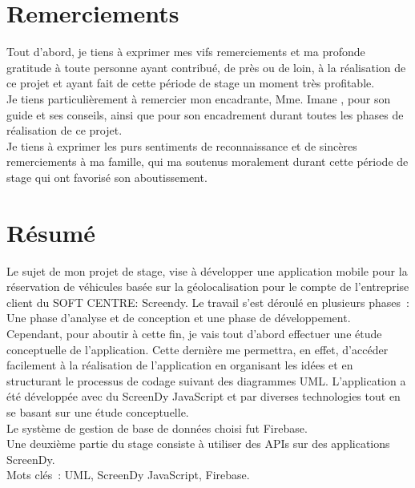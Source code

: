 \documentclass[12pt,a4paper]{report}
\begin{document}
	\chapter*{Remerciements}
	
	Tout d'abord, je tiens à exprimer mes vifs remerciements et ma profonde gratitude à toute personne ayant contribué, de près ou de loin, à la réalisation de ce projet et ayant fait de cette période de stage un moment très profitable.\\
	\newline
	Je tiens particulièrement à remercier mon encadrante, Mme. Imane , pour son guide et ses conseils, ainsi que pour son encadrement durant toutes les phases de réalisation de ce projet.\\
	\newline
	Je tiens à exprimer les purs sentiments de reconnaissance et de sincères remerciements à ma famille, qui ma soutenus moralement durant cette période de stage qui ont favorisé son aboutissement.





	\chapter*{Résumé}
	Le sujet de mon projet de stage, vise à développer une application mobile pour la réservation de véhicules basée sur la géolocalisation pour le compte de l'entreprise client du SOFT CENTRE: Screendy. Le travail s’est déroulé en plusieurs phases : Une phase d’analyse et de conception et une phase de développement.\\
Cependant, pour aboutir à cette fin, je vais tout d’abord effectuer une étude conceptuelle de l’application. Cette dernière me permettra, en effet, d’accéder facilement à la réalisation de l’application en organisant les idées et en structurant le processus de codage suivant des diagrammes UML. L’application a été développée avec du \guillemotleft ScreenDy JavaScript \guillemotright et par diverses technologies tout en se basant sur une étude conceptuelle.\\
Le système de gestion de base de données choisi fut Firebase.\\
Une deuxième partie du stage consiste à utiliser des APIs sur des applications ScreenDy.\\
Mots clés : UML, ScreenDy JavaScript, Firebase.
\end{document}
